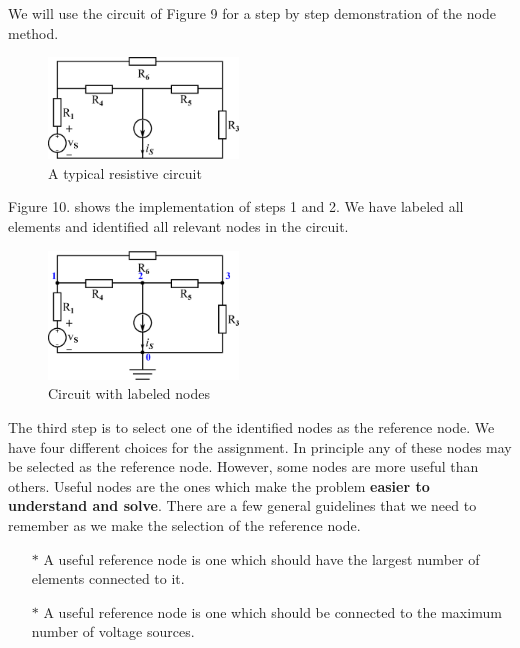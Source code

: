 \documentclass[a4 paper]{article}
\numberwithin{equation}{section}
\newcommand{\0}{\mathbf{0}}
\begin{document}
We will use the circuit of Figure 9 for a step by step demonstration of the node method. 

\begin{figure}[ht!]
  \caption{A typical resistive circuit}
  \centering
  \includegraphics[width=0.45\textwidth]{./images/nodemethod_0}
\end{figure}

Figure 10. shows the implementation of steps 1 and 2. We have labeled all elements and identified all relevant nodes in the circuit.  

\begin{figure}[ht!]
  \caption{Circuit with labeled nodes}
  \centering
  \hspace{5 mm}
  \includegraphics[width=0.45\textwidth]{./images/nodemethod_1}
\end{figure}


The third step is to select one of the identified nodes as the reference node. We have four different choices for the assignment. In principle any of these nodes may be selected as 
the reference node. However, some nodes are more useful than others. Useful nodes are the ones which make the problem {\bf easier to understand and solve}. There are a few general guidelines that we need to remember as we make the selection of the reference node. 


\begin{enumerate} \itemsep1pt \parskip0pt 
  \item[$\ast$] A useful reference node is one which should have the largest number of elements connected to it. 
  \item[$\ast$] A useful reference node is one which should be connected to the maximum number of voltage sources. 
\end{enumerate}
\end{document}
